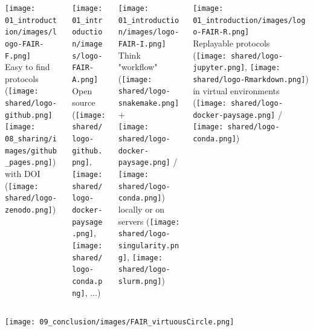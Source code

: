 \begin{frame}{\FAIRB}
\begin{columns}[t]
  \begin{column}{.25\textwidth}
      \begin{center}
      \texttt{[image: 01\_introduction/images/logo-FAIR-F.png]}\\Easy to find protocols\\(\texttt{[image: shared/logo-github.png]} \texttt{[image: 08\_sharing/images/github\_pages.png]})\\with DOI (\texttt{[image: shared/logo-zenodo.png]})
      \end{center}
  \end{column}
  \begin{column}{.25\textwidth}
      \begin{center}
      \texttt{[image: 01\_introduction/images/logo-FAIR-A.png]}\\Open source (\texttt{[image: shared/logo-github.png]},\\ \texttt{[image: shared/logo-docker-paysage.png]},\\ \texttt{[image: shared/logo-conda.png]}, ...)
      \end{center}
  \end{column}
  \begin{column}{.25\textwidth}
     \begin{center}
     \texttt{[image: 01\_introduction/images/logo-FAIR-I.png]}\\Think "workflow" (\texttt{[image: shared/logo-snakemake.png]} +\\ \texttt{[image: shared/logo-docker-paysage.png]} / \texttt{[image: shared/logo-conda.png]})\\locally or on servers (\texttt{[image: shared/logo-singularity.png]}, \texttt{[image: shared/logo-slurm.png]})
     \end{center}
  \end{column}
  \begin{column}{.25\textwidth}
     \begin{center}
     \texttt{[image: 01\_introduction/images/logo-FAIR-R.png]}\\Replayable protocols\\(\texttt{[image: shared/logo-jupyter.png]}, \texttt{[image: shared/logo-Rmarkdown.png]}) in virtual environments (\texttt{[image: shared/logo-docker-paysage.png]} / \texttt{[image: shared/logo-conda.png]})
     \end{center}
  \end{column}
\end{columns}
\begin{center}
    \texttt{[image: 09\_conclusion/images/FAIR\_virtuousCircle.png]}
\end{center}
\end{frame}
